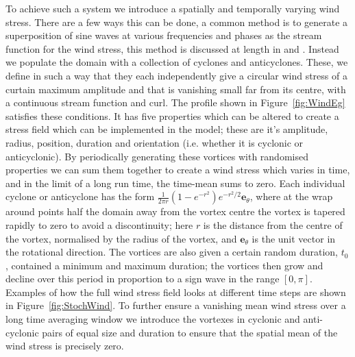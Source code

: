 \documentclass[12pt,a4paper]{report}
\begin{document}
To achieve such a system we introduce a spatially and temporally 
varying wind stress. There are a few  ways this can be done, a common method
is to generate a superposition of sine waves at various frequencies and 
phases as the stream function for the wind stress, this method is discussed at
length in \cite{koszalka2009dynamics} and \cite{brannigan2015seasonal}. 
Instead we populate the domain
with a collection of cyclones and       anticyclones. These, we define
in such a way that they each  independently give a circular wind
stress of a curtain maximum amplitude and that is vanishing small far from its centre,
with a continuous stream function      and curl. The profile shown in 
Figure~\ref{fig:WindEg}
satisfies these conditions. It has five properties which can be altered to 
create a stress field which can be implemented in the model; these are it's
amplitude, radius, position, duration and orientation (i.e. whether it is cyclonic
or anticyclonic). By periodically generating these vortices with randomised properties
we can sum them together to create a wind stress which varies in time, and in the limit
of a long run time, the time-mean sums to zero. Each individual cyclone or anticyclone
has the form $\frac{1}{2\pi r}(1-e^{-r^{2}})e^{-r^{2}/2}\boldsymbol{e}_{\theta}$, where
at the wrap around points half the domain away from the vortex centre the vortex is tapered
rapidly to zero to avoid a discontinuity; here $r$ is the distance from the centre of the vortex, normalised by the
radius of the vortex, and $\boldsymbol{e}_{\theta}$ is the unit vector in the 
rotational direction. The vortices are also given a certain random duration, $t_{0}$, contained a minimum and maximum duration; the vortices then
grow and decline over this period in proportion to a sign wave in the range $[0,\pi]$.
Examples of how the full wind stress field looks at different
time steps are shown in Figure~\ref{fig:StochWind}. To further ensure a vanishing
mean wind stress over a long time averaging window we introduce the vortexes in cyclonic
and anti-cyclonic pairs of equal size and duration to ensure that the spatial mean
of the wind stress is precisely zero. 
\end{document}
